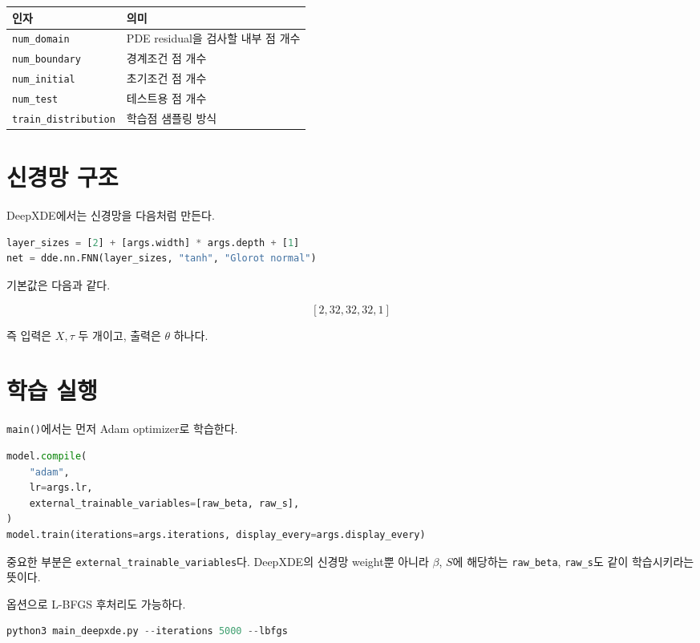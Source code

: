\documentclass[11pt]{article}
\begin{document}
\begin{center}
\begin{tabular}{ll}
\toprule
인자 & 의미 \\
\midrule
\texttt{num\_domain} & PDE residual을 검사할 내부 점 개수 \\
\texttt{num\_boundary} & 경계조건 점 개수 \\
\texttt{num\_initial} & 초기조건 점 개수 \\
\texttt{num\_test} & 테스트용 점 개수 \\
\texttt{train\_distribution} & 학습점 샘플링 방식 \\
\bottomrule
\end{tabular}
\end{center}

\section{신경망 구조}

DeepXDE에서는 신경망을 다음처럼 만든다.

\begin{lstlisting}[language=Python]
layer_sizes = [2] + [args.width] * args.depth + [1]
net = dde.nn.FNN(layer_sizes, "tanh", "Glorot normal")
\end{lstlisting}

기본값은 다음과 같다.

\[
[2, 32, 32, 32, 1]
\]

즉 입력은 \(X,\tau\) 두 개이고, 출력은 \(\theta\) 하나다.

\section{학습 실행}

\texttt{main()}에서는 먼저 Adam optimizer로 학습한다.

\begin{lstlisting}[language=Python]
model.compile(
    "adam",
    lr=args.lr,
    external_trainable_variables=[raw_beta, raw_s],
)
model.train(iterations=args.iterations, display_every=args.display_every)
\end{lstlisting}

중요한 부분은 \texttt{external\_trainable\_variables}다. DeepXDE의 신경망 weight뿐 아니라 \(\beta\), \(S\)에 해당하는 \texttt{raw\_beta}, \texttt{raw\_s}도 같이 학습시키라는 뜻이다.

옵션으로 L-BFGS 후처리도 가능하다.

\begin{lstlisting}[language=Python]
python3 main_deepxde.py --iterations 5000 --lbfgs
\end{lstlisting}
\end{document}
